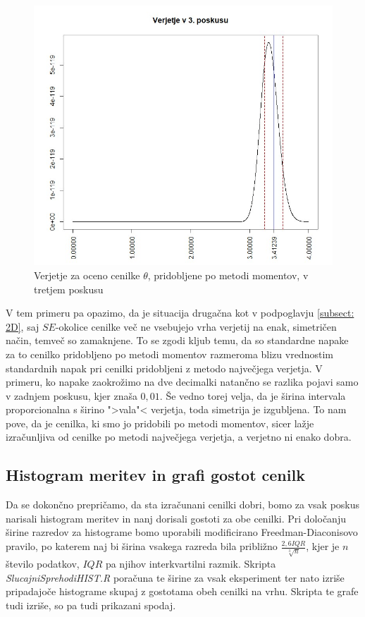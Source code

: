 \documentclass[a4paper, 10pt]{article}
\begin{document}
	\begin{figure}[h!]
		\label{fig: 2Eplot3}
		\centering
		\includegraphics[scale = 0.31]{VerjetjeMM3}
		\caption{Verjetje za oceno cenilke $\theta$, pridobljene po metodi momentov, v tretjem poskusu}
	\end{figure}
	
	V tem primeru pa opazimo, da je situacija drugačna kot v podpoglavju \ref{subsect: 2D}, saj $SE$-okolice cenilke več ne vsebujejo vrha verjetij na enak, simetričen način, temveč so zamaknjene. To se zgodi kljub temu, da so standardne napake za to cenilko pridobljeno po metodi momentov razmeroma blizu vrednostim standardnih napak pri cenilki pridobljeni z metodo največjega verjetja. V primeru, ko napake zaokrožimo na dve decimalki natančno se razlika pojavi samo v zadnjem poskusu, kjer znaša $0{,}01$. Še vedno torej velja, da je širina intervala proporcionalna s širino ">vala"< verjetja, toda simetrija je izgubljena. To nam pove, da je cenilka, ki smo jo pridobili po metodi momentov, sicer lažje izračunljiva od cenilke po metodi največjega verjetja, a verjetno ni enako dobra.
	
	\subsection{Histogram meritev in grafi gostot cenilk} \label{subsect: 2F}
	Da se dokončno prepričamo, da sta izračunani cenilki dobri, bomo za vsak poskus narisali histogram meritev in nanj dorisali gostoti za obe cenilki. Pri določanju širine razredov za histograme bomo uporabili modificirano Freedman-Diaconisovo pravilo, po katerem naj bi širina vsakega razreda bila približno $\frac{2{,}6IQR}{\sqrt[3]{n}}$, kjer je $n$ število podatkov, $IQR$ pa njihov interkvartilni razmik. Skripta \textit{SlucajniSprehodiHIST.R} poračuna te širine za vsak eksperiment ter nato izriše pripadajoče histograme skupaj z gostotama obeh cenilki na vrhu. Skripta te grafe tudi izriše, so pa tudi prikazani spodaj.
	
\end{document}
